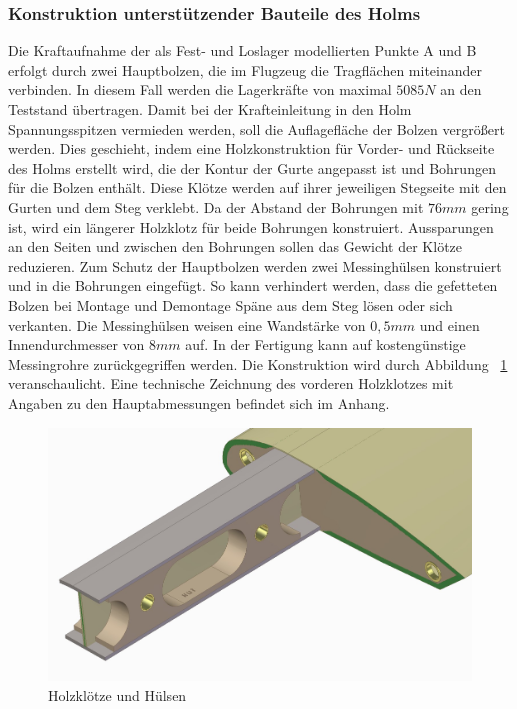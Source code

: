 \subsubsection{Konstruktion unterstützender Bauteile des Holms}
Die Kraftaufnahme der  als Fest- und Loslager modellierten Punkte A und B erfolgt durch zwei Hauptbolzen, die im Flugzeug die Tragflächen miteinander verbinden. In diesem Fall werden die Lagerkräfte von maximal $ 5085N $ an den Teststand übertragen. Damit bei der Krafteinleitung in den Holm Spannungsspitzen vermieden werden, soll die Auflagefläche der Bolzen vergrößert werden. Dies geschieht, indem eine Holzkonstruktion für Vorder- und Rückseite des Holms erstellt wird, die der Kontur der Gurte angepasst ist und Bohrungen für die Bolzen enthält. Diese Klötze werden auf ihrer jeweiligen Stegseite mit den Gurten und dem Steg verklebt. Da der Abstand der Bohrungen mit $ 76mm $ gering ist, wird ein längerer Holzklotz für beide Bohrungen konstruiert. Aussparungen an den Seiten und zwischen den Bohrungen sollen das Gewicht der Klötze reduzieren. Zum Schutz der Hauptbolzen werden zwei Messinghülsen konstruiert und in die Bohrungen eingefügt. So kann verhindert werden, dass die gefetteten Bolzen bei Montage und Demontage Späne aus dem Steg lösen oder sich verkanten. Die Messinghülsen weisen eine Wandstärke von $ 0,5mm $ und einen Innendurchmesser von $ 8mm $ auf. In der Fertigung kann auf kostengünstige Messingrohre zurückgegriffen werden. Die Konstruktion wird durch Abbildung ~\ref{fig: Klotz} veranschaulicht. Eine technische Zeichnung des vorderen Holzklotzes mit Angaben zu den Hauptabmessungen befindet sich im Anhang.
\begin{figure}[h]
	\includegraphics[width=1.0\textwidth]{Bilder/Klotz.jpg}
	\caption{Holzklötze und Hülsen}
	\label{fig: Klotz}
\end{figure}

